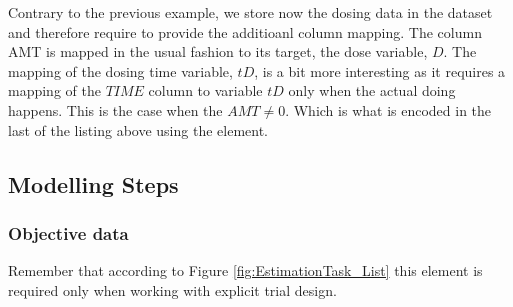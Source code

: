 Contrary to the previous example, we store now the dosing data in the dataset
and therefore require to provide the additioanl column mapping. The column AMT
is mapped in the usual fashion to its target, the dose variable, $D$. 
The mapping of the dosing time variable, $tD$, is a bit more interesting as it requires 
a mapping of the $TIME$ column to variable $tD$ only when the actual doing happens. This is
the case when the $AMT \neq 0$. Which is what is encoded in the last 
 of the listing above using the  element.



\subsection{Modelling Steps}

\subsubsection{Objective data}
Remember that according to Figure \ref{fig:EstimationTask_List} this element
is required only when working with explicit trial design.

